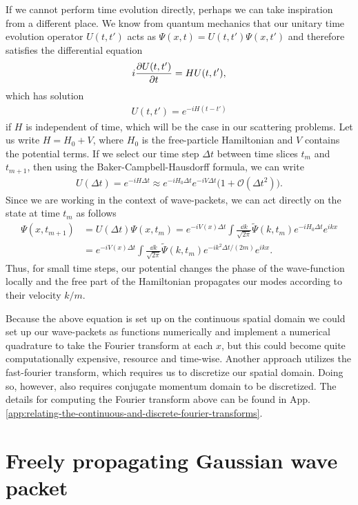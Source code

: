 If we cannot perform time evolution directly, perhaps we can take inspiration from a different place.
We know from quantum mechanics that our unitary time evolution operator $U(t,t')$ acts as $\Psi(x,t) = U(t,t') \Psi(x,t')$ and therefore satisfies the differential equation
\begin{align}
    i \pdv{U(t,t')}{t} = H U(t,t')
,\end{align}
which has solution
\begin{align}
    U(t,t') = e^{-i H (t - t')}
\end{align}
if $H$ is independent of time, which will be the case in our scattering problems.
Let us write $H = H_0 + V$, where $H_0$ is the free-particle Hamiltonian and $V$ contains the potential terms.
If we select our time step $\Delta t$ between time slices $t_{m}$ and $t_{m+1}$, then using the Baker-Campbell-Hausdorff formula, we can write
\begin{align}
    U(\Delta t) = e^{-i H \Delta t} \approx e^{-i H_0 \Delta t} e^{-i V \Delta t} \Big( 1 + \mathcal{O}(\Delta t^2) \Big)
.\end{align}
Since we are working in the context of wave-packets, we can act directly on the state at time $t_{m}$ as follows
\begin{align}
    \Psi(x,t_{m+1}) &= U(\Delta t) \Psi(x,t_{m}) = e^{-i V(x) \Delta t} \int \frac{\dd{k}}{\sqrt{2 \pi}} \widetilde{\Psi}(k,t_{m}) e^{-i H_0 \Delta t} e^{i k x} \nonumber \\
    &= e^{-i V(x) \Delta t} \int \frac{\dd{k}}{\sqrt{2 \pi}} \widetilde{\Psi}(k,t_{m}) e^{- i k^2 \Delta t / (2m)} e^{i k x}
.\end{align}
Thus, for small time steps, our potential changes the phase of the wave-function locally and the free part of the Hamiltonian propagates our modes according to their velocity $k/m$.

Because the above equation is set up on the continuous spatial domain we could set up our wave-packets as functions numerically and implement a numerical quadrature to take the Fourier transform at each $x$, but this could become quite computationally expensive, resource and time-wise.
Another approach utilizes the fast-fourier transform, which requires us to discretize our spatial domain.
Doing so, however, also requires conjugate momentum domain to be discretized.
The details for computing the Fourier transform above can be found in App. \ref{app:relating-the-continuous-and-discrete-fourier-transforms}.


\section{Freely propagating Gaussian wave packet}
\label{sec:freely-propagating-gaussian-wave-packet}

